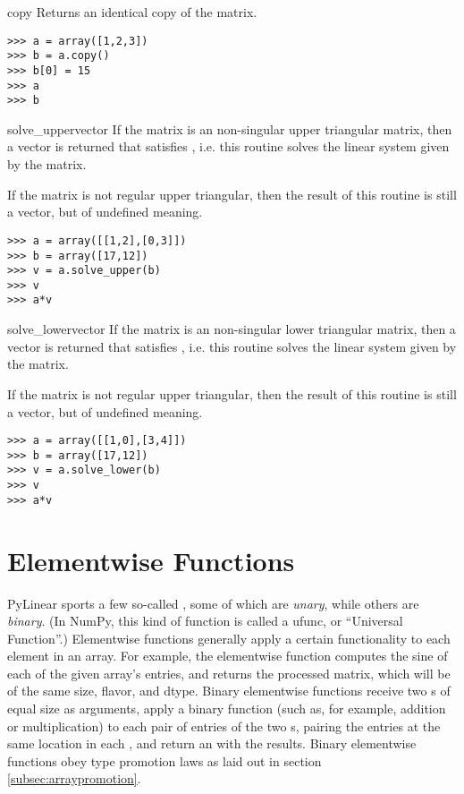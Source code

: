 \begin{methoddesc}{copy}{}
  Returns an identical copy of the matrix.
\begin{verbatim}
>>> a = array([1,2,3])
>>> b = a.copy()
>>> b[0] = 15
>>> a
>>> b
\end{verbatim}
\end{methoddesc}
\begin{methoddesc}{solve_upper}{vector}
  If the matrix is an non-singular upper triangular matrix, then a vector
   is returned that satisfies , i.e.
  this routine solves the linear system given by the matrix.

  If the matrix is not regular upper triangular, then the result of this routine
  is still a vector, but of undefined meaning.
\begin{verbatim}
>>> a = array([[1,2],[0,3]])
>>> b = array([17,12])
>>> v = a.solve_upper(b)
>>> v
>>> a*v
\end{verbatim}
\end{methoddesc}
\begin{methoddesc}{solve_lower}{vector}
  If the matrix is an non-singular lower triangular matrix, then a vector
   is returned that satisfies , i.e.
  this routine solves the linear system given by the matrix.

  If the matrix is not regular upper triangular, then the result of this routine
  is still a vector, but of undefined meaning.
  
\begin{verbatim}
>>> a = array([[1,0],[3,4]])
>>> b = array([17,12])
>>> v = a.solve_lower(b)
>>> v
>>> a*v
\end{verbatim}
\end{methoddesc}

\section{Elementwise Functions}
\label{subsec:elementwise-funcs}

PyLinear sports a few so-called ,
 some of which are
\emph{unary}, while others are \emph{binary}. (In NumPy, this kind of function
is called a ufunc, or ``Universal Function''.) Elementwise functions generally
apply a certain functionality to each element in an array. For example, the
 elementwise function computes the sine of each of the given
array's entries, and returns the processed matrix, which will be of the same
size, flavor, and dtype. Binary elementwise functions receive two
s of equal size as arguments, apply a binary function (such as,
for example, addition or multiplication) to each pair of entries of the two
s, pairing the entries at the same location in each ,
and return an  with the results. Binary elementwise functions obey
type promotion laws as laid out in section \ref{subsec:arraypromotion}.

